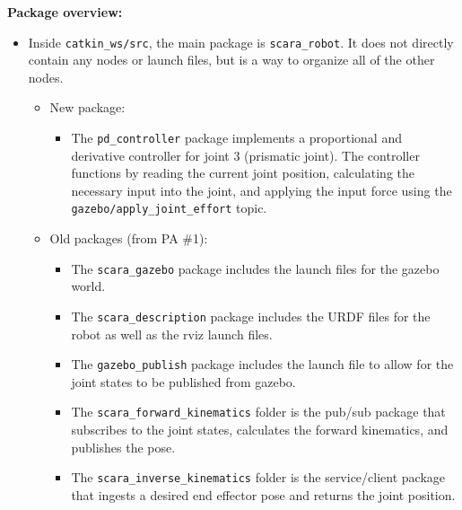 \documentclass[10pt]{article}
\begin{document}
\setlength{\abovedisplayskip}{6pt}
\setlength{\belowdisplayskip}{3pt}
\setlength{\abovedisplayshortskip}{4pt}
\setlength{\belowdisplayshortskip}{4pt}

\textbf{Package overview:}
\begin{itemize}
	\item Inside \texttt{catkin\_ws/src}, the main package is \texttt{scara\_robot}. It does not directly contain any nodes or launch files, but is a way to organize all of the other nodes.
	\begin{itemize}
		\item New package:
		\begin{itemize}
			\item The \texttt{pd\_controller} package implements a proportional and derivative controller for joint 3 (prismatic joint). The controller functions by reading the current joint position, calculating the necessary input into the joint, and applying the input force using the \texttt{gazebo/apply\_joint\_effort} topic.
		\end{itemize}
		
		\item Old packages (from PA \#1):
		\begin{itemize}
			\item The \texttt{scara\_gazebo} package includes the launch files for the gazebo world.
			\item The \texttt{scara\_description} package includes the URDF files for the robot as well as the rviz launch files.
			\item The \texttt{gazebo\_publish} package includes the launch file to allow for the joint states to be published from gazebo.
			\item The \texttt{scara\_forward\_kinematics} folder is the pub/sub package that subscribes to the joint states, calculates the forward kinematics, and publishes the pose.
			\item The \texttt{scara\_inverse\_kinematics} folder is the service/client package that ingests a desired end effector pose and returns the joint position.
		\end{itemize}
	\end{itemize}
\end{itemize}
\end{document}
